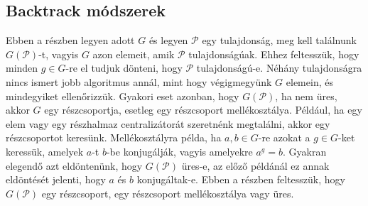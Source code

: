 \subsection{Backtrack módszerek}
\label{subsec:permbt}
Ebben a részben legyen adott $G$ és legyen $\mathcal{P}$ egy tulajdonság, meg kell találnunk $G(\mathcal{P})$-t, vagyis $G$ azon elemeit, amik $\mathcal{P}$ tulajdonságúak.
Ehhez feltesszük, hogy minden $g \in G$-re el tudjuk dönteni, hogy $\mathcal{P}$ tulajdonságú-e.
Néhány tulajdonságra nincs ismert jobb algoritmus annál, mint hogy végigmegyünk $G$ elemein, és mindegyiket ellenőrizzük.
Gyakori eset azonban, hogy $G(\mathcal{P})$, ha nem üres, akkor $G$ egy részcsoportja, esetleg egy részcsoport mellékosztálya.
Például, ha egy elem vagy egy részhalmaz centralizátorát szeretnénk megtalálni, akkor egy részcsoportot keresünk.
Mellékosztályra példa, ha $a, b \in G$-re azokat a $g \in G$-ket keressük, amelyek $a$-t $b$-be konjugálják, vagyis amelyekre $a^g = b$.
Gyakran elegendő azt eldöntenünk, hogy $G(\mathcal{P})$ üres-e, az előző példánál ez annak eldöntését jelenti, hogy $a$ és $b$ konjugáltak-e.
Ebben a részben feltesszük, hogy $G(\mathcal{P})$ egy részcsoport, egy részcsoport mellékosztálya vagy üres.

